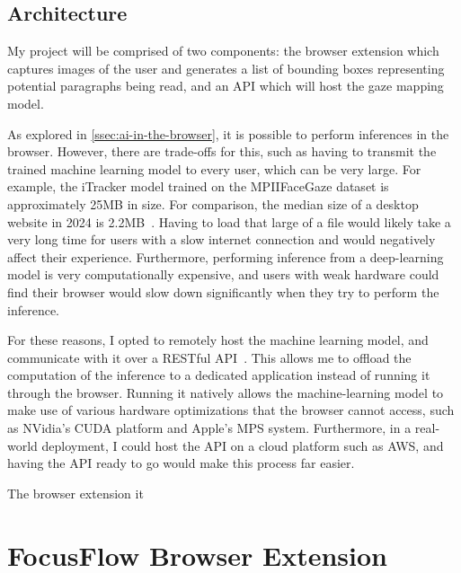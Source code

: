 \documentclass{report}
\begin{document}
\section{Architecture}

My project will be comprised of two components: the browser extension which captures images of the user and generates a list of bounding boxes representing potential paragraphs being read, and an API which will host the gaze mapping model.

As explored in \autoref{ssec:ai-in-the-browser}, it is possible to perform inferences in the browser. However, there are trade-offs for this, such as having to transmit the trained machine learning model to every user, which can be very large. For example, the iTracker model trained on the MPIIFaceGaze dataset is approximately 25MB in size. For comparison, the median size of a desktop website in 2024 is 2.2MB~\cite{httparchive2024pageweight}. Having to load that large of a file would likely take a very long time for users with a slow internet connection and would negatively affect their experience. Furthermore, performing inference from a deep-learning model is very computationally expensive, and users with weak hardware could find their browser would slow down significantly when they try to perform the inference. 

For these reasons, I opted to remotely host the machine learning model, and communicate with it over a RESTful API~\cite{fielding2000phd}. This allows me to offload the computation of the inference to a dedicated application instead of running it through the browser. Running it natively allows the machine-learning model to make use of various hardware optimizations that the browser cannot access, such as NVidia's CUDA platform and Apple's MPS system. Furthermore, in a real-world deployment, I could host the API on a cloud platform such as AWS, and having the API ready to go would make this process far easier. 



The browser extension it




\chapter{FocusFlow Browser Extension}
\label{chap:methods}

\end{document}
